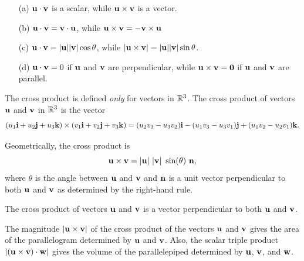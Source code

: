 \begin{itemize}
  \item[(a)] $\mathbf{u}\cdot\mathbf{v}$ is a scalar, while $\mathbf{u}\times\mathbf{v}$ is a vector.
  \item[(b)] $\mathbf{u}\cdot\mathbf{v} = \mathbf{v}\cdot\mathbf{u}$, while $\mathbf{u}\times\mathbf{v} = -\mathbf{v}\times\mathbf{u}$
  \item[(c)] $\mathbf{u}\cdot\mathbf{v} = |\mathbf{u}||\mathbf{v}|\cos\theta$, while 
    $|\mathbf{u}\times\mathbf{v}| = |\mathbf{u}||\mathbf{v}|\sin\theta$.
  \item[(d)] $\mathbf{u}\cdot\mathbf{v} = 0$ if $\mathbf{u}$ and $\mathbf{v}$ are perpendicular, while
    $\mathbf{u}\times\mathbf{v} = \mathbf{0}$ if $\mathbf{u}$ and $\mathbf{v}$ are parallel.
\end{itemize}

\begin{summary}
\item The cross product is defined \emph{only} for vectors in
  $\mathbb{R}^3$. The cross product of vectors $\mathbf{u}$ and $\mathbf{v}$ in $\mathbb{R}^3$ is
  the vector
\[(u_1 \mathbf{i} + u_2 \mathbf{j} + u_3 \mathbf{k}) \times (v_1 \mathbf{i} + v_2 \mathbf{j} + v_3 \mathbf{k}) =
(u_2v_3-u_3v_2) \mathbf{i} - (u_1v_3 - u_3v_1) \mathbf{j} + (u_1v_2 - u_2v_1) \mathbf{k}.\]

\item Geometrically, the cross product is
\[\mathbf{u} \times \mathbf{v} = |\mathbf{u}| \ |\mathbf{v}| \ \sin(\theta) \ \mathbf{n},\]
where $\theta$ is the angle between $\mathbf{u}$ and $\mathbf{v}$ and $\mathbf{n}$ is a
unit vector perpendicular to both $\mathbf{u}$ and $\mathbf{v}$ as determined by the
right-hand rule.

\item The cross product of vectors $\mathbf{u}$ and $\mathbf{v}$ is a vector
  perpendicular to both $\mathbf{u}$ and $\mathbf{v}$. 

\item The magnitude $|\mathbf{u} \times \mathbf{v}|$ of the cross product of the
  vectors $\mathbf{u}$ and $\mathbf{v}$ gives the area of the parallelogram
  determined by $\mathbf{u}$ and $\mathbf{v}$. Also, 
  the scalar triple product $|(\mathbf{u} \times
  \mathbf{v}) \cdot \mathbf{w}|$ gives the volume of the parallelepiped determined by
  $\mathbf{u}$, $\mathbf{v}$, and $\mathbf{w}$.
\end{summary}




\nin \hrulefill



\clearpage

